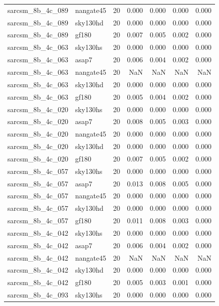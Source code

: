 \begin{tabular}{llrrrrr}
sarcsm\_8b\_4c\_089 & nangate45 & 20 & 0.000 & 0.000 & 0.000 & 0.000 \\
sarcsm\_8b\_4c\_089 & sky130hd & 20 & 0.000 & 0.000 & 0.000 & 0.000 \\
sarcsm\_8b\_4c\_089 & gf180 & 20 & 0.007 & 0.005 & 0.002 & 0.000 \\
sarcsm\_8b\_4c\_063 & sky130hs & 20 & 0.000 & 0.000 & 0.000 & 0.000 \\
sarcsm\_8b\_4c\_063 & asap7 & 20 & 0.006 & 0.004 & 0.002 & 0.000 \\
sarcsm\_8b\_4c\_063 & nangate45 & 20 & NaN & NaN & NaN & NaN \\
sarcsm\_8b\_4c\_063 & sky130hd & 20 & 0.000 & 0.000 & 0.000 & 0.000 \\
sarcsm\_8b\_4c\_063 & gf180 & 20 & 0.005 & 0.004 & 0.002 & 0.000 \\
sarcsm\_8b\_4c\_020 & sky130hs & 20 & 0.000 & 0.000 & 0.000 & 0.000 \\
sarcsm\_8b\_4c\_020 & asap7 & 20 & 0.008 & 0.005 & 0.003 & 0.000 \\
sarcsm\_8b\_4c\_020 & nangate45 & 20 & 0.000 & 0.000 & 0.000 & 0.000 \\
sarcsm\_8b\_4c\_020 & sky130hd & 20 & 0.000 & 0.000 & 0.000 & 0.000 \\
sarcsm\_8b\_4c\_020 & gf180 & 20 & 0.007 & 0.005 & 0.002 & 0.000 \\
sarcsm\_8b\_4c\_057 & sky130hs & 20 & 0.000 & 0.000 & 0.000 & 0.000 \\
sarcsm\_8b\_4c\_057 & asap7 & 20 & 0.013 & 0.008 & 0.005 & 0.000 \\
sarcsm\_8b\_4c\_057 & nangate45 & 20 & 0.000 & 0.000 & 0.000 & 0.000 \\
sarcsm\_8b\_4c\_057 & sky130hd & 20 & 0.000 & 0.000 & 0.000 & 0.000 \\
sarcsm\_8b\_4c\_057 & gf180 & 20 & 0.011 & 0.008 & 0.003 & 0.000 \\
sarcsm\_8b\_4c\_042 & sky130hs & 20 & 0.000 & 0.000 & 0.000 & 0.000 \\
sarcsm\_8b\_4c\_042 & asap7 & 20 & 0.006 & 0.004 & 0.002 & 0.000 \\
sarcsm\_8b\_4c\_042 & nangate45 & 20 & NaN & NaN & NaN & NaN \\
sarcsm\_8b\_4c\_042 & sky130hd & 20 & 0.000 & 0.000 & 0.000 & 0.000 \\
sarcsm\_8b\_4c\_042 & gf180 & 20 & 0.005 & 0.003 & 0.001 & 0.000 \\
sarcsm\_8b\_4c\_093 & sky130hs & 20 & 0.000 & 0.000 & 0.000 & 0.000 \\

\end{tabular}
